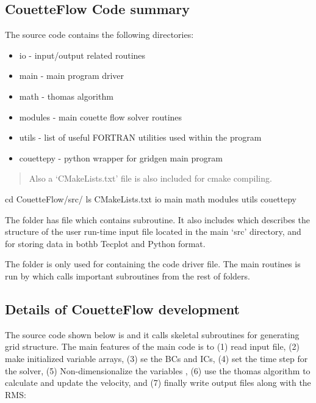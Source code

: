 \documentclass[letterpaper,10pt,english]{sphinxmanual}
\begin{document}
\subsection{CouetteFlow Code summary}
\label{\detokenize{devel:couetteflow-code-summary}}
The source code contains the following directories:
\begin{itemize}
\item {} 
io - input/output related routines

\item {} 
main - main program driver

\item {} 
math - thomas algorithm

\item {} 
modules - main couette flow solver routines

\item {} 
utils - list of useful FORTRAN utilities used within the program

\item {} 
couettepy - python wrapper for gridgen main program

\end{itemize}
\begin{quote}

Also a ‘CMakeLists.txt’ file is also included for cmake compiling.
\end{quote}

\begin{sphinxVerbatim}[commandchars=\\\{\}]
\PYGZdl{} cd CouetteFlow/src/
\PYGZdl{} ls
\PYGZdl{} CMakeLists.txt  io  main math modules utils couettepy
\end{sphinxVerbatim}

The  folder has  file which contains  subroutine. It also includes  which describes the structure of the user run-time input file located in the main ‘src’ directory, and  for storing data in bothb Tecplot and Python format.

The  folder is only used for containing the code driver file. The main routines is run by  which calls important subroutines from the rest of folders.


\subsection{Details of CouetteFlow development}
\label{\detokenize{devel:details-of-couetteflow-development}}
The source code shown below is  and it calls skeletal subroutines for generating grid structure. The main features of the main code is to (1) read input file, (2) make initialized variable arrays, (3) se the BCs and ICs, (4) set the time step for the solver, (5) Non-dimensionalize the variables , (6) use the thomas algorithm to calculate and update the velocity, and (7) finally write output files along with the RMS:
\end{document}
